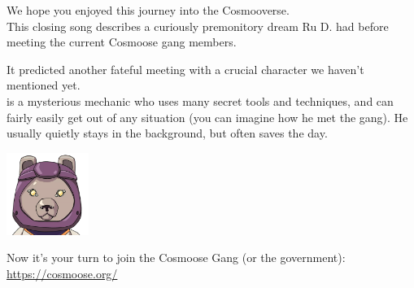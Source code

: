 We hope you enjoyed this journey into the Cosmooverse. \\

This closing song describes a curiously premonitory dream Ru D. had before meeting the current Cosmoose gang members. 

It predicted another fateful meeting with a crucial character we haven't mentioned yet.\\

 is a mysterious mechanic who uses many secret tools and techniques, and can fairly easily get out of any situation (you can imagine how he met the gang). He usually quietly stays in the background, but often saves the day.

\begin{center}
\includegraphics[width=0.2\textwidth]{Assets/wool-head}
\end{center}

Now it's your turn to join the Cosmoose Gang (or the government):\\
\url{https://cosmoose.org/}

\clearpage
